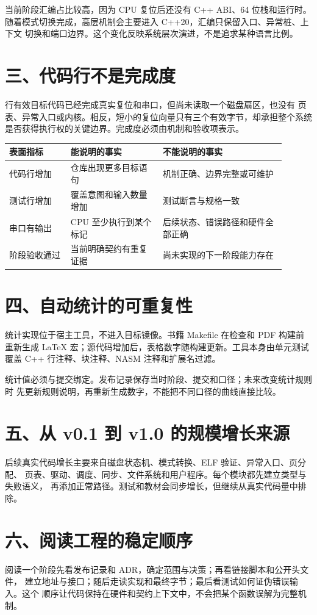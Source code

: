 当前阶段汇编占比较高，因为 CPU 复位后还没有 C++ ABI、64 位栈和运行时。
随着模式切换完成，高层机制会主要进入 C++20，汇编只保留入口、异常桩、上下文
切换和端口边界。这个变化反映系统层次演进，不是追求某种语言比例。

\section{三、代码行不是完成度}

\OsProductionCodeLineCount 行有效目标代码已经完成真实复位和串口，但尚未读取一个磁盘扇区，也没有
页表、异常入口或内核。相反，短小的复位向量只有三个有效字节，却承担整个系统
是否获得执行权的关键边界。完成度必须由机制和验收项表示。

\begin{longtable}{L{0.20\linewidth}L{0.30\linewidth}L{0.40\linewidth}}
\toprule
表面指标 & 能说明的事实 & 不能说明的事实 \\
\midrule
代码行增加 & 仓库出现更多目标语句 & 机制正确、边界完整或可维护 \\
测试行增加 & 覆盖意图和输入数量增加 & 测试断言与规格一致 \\
串口有输出 & CPU 至少执行到某个标记 & 后续状态、错误路径和硬件全部正确 \\
阶段验收通过 & 当前明确契约有重复证据 & 尚未实现的下一阶段能力存在 \\
\bottomrule
\end{longtable}

\section{四、自动统计的可重复性}

统计实现位于宿主工具，不进入目标镜像。书籍 Makefile 在检查和 PDF 构建前
重新生成 LaTeX 宏；源代码增加后，表格数字随构建更新。工具本身由单元测试
覆盖 C++ 行注释、块注释、NASM 注释和扩展名过滤。

统计值必须与提交绑定。发布记录保存当时阶段、提交和口径；未来改变统计规则时
先更新规则说明，再重新生成数字，不能把不同口径的曲线直接比较。

\section{五、从 v0.1 到 v1.0 的规模增长来源}

后续真实代码增长主要来自磁盘状态机、模式转换、ELF 验证、异常入口、页分配、
页表、驱动、调度、同步、文件系统和用户程序。每个模块都先建立类型与失败语义，
再添加正常路径。测试和教材会同步增长，但继续从真实代码量中排除。

\section{六、阅读工程的稳定顺序}

阅读一个阶段先看发布记录和 ADR，确定范围与决策；再看链接脚本和公开头文件，
建立地址与接口；随后走读实现和最终字节；最后看测试如何证伪错误输入。这个
顺序让代码保持在硬件和契约上下文中，不会把某个函数误解为完整机制。
